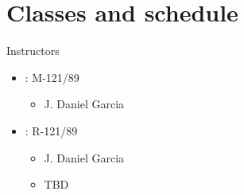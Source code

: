 \section{Classes and schedule}

\begin{frame}[t]{Instructors}
\begin{itemize}
  \item {}: M-121/89
    \begin{itemize}
      \item J. Daniel Garcia
    \end{itemize}
  \item {}: R-121/89
    \begin{itemize}
      \item J. Daniel Garcia
      \item TBD
    \end{itemize}
\end{itemize}
\end{frame}

